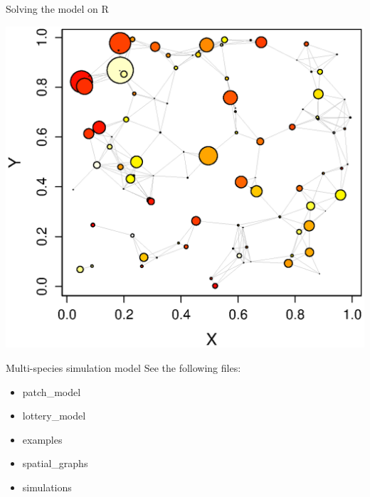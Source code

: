 \documentclass{eecslides}
\begin{document}

	\begin{frame}{Solving the model on R}
		\begin{center}
			\includegraphics[height=0.7\textheight]{eq_metapop}
		\end{center}
	\end{frame}
	

	\begin{frame}{Multi-species simulation model}
		See the following files:\\
		\begin{itemize}
			\item patch\_model
			\item lottery\_model
			\item examples
			\item spatial\_graphs
			\item simulations
		\end{itemize}
	\end{frame}
	

\end{document}
